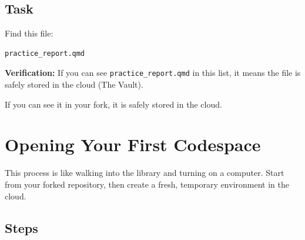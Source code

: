\documentclass[
  letterpaper,
  DIV=11,
  numbers=noendperiod,
  oneside]{scrreprt}
\begin{document}
\section{Task}\label{task-1}

Find this file:

\begin{verbatim}
practice_report.qmd
\end{verbatim}

\textbf{Verification:} If you can see \texttt{practice\_report.qmd} in
this list, it means the file is safely stored in the cloud (The Vault).

If you can see it in your fork, it is safely stored in the cloud.

\chapter{Opening Your First
Codespace}\label{opening-your-first-codespace}

This process is like walking into the library and turning on a computer.
Start from your forked repository, then create a fresh, temporary
environment in the cloud.

\section{Steps}\label{steps}
\end{document}
